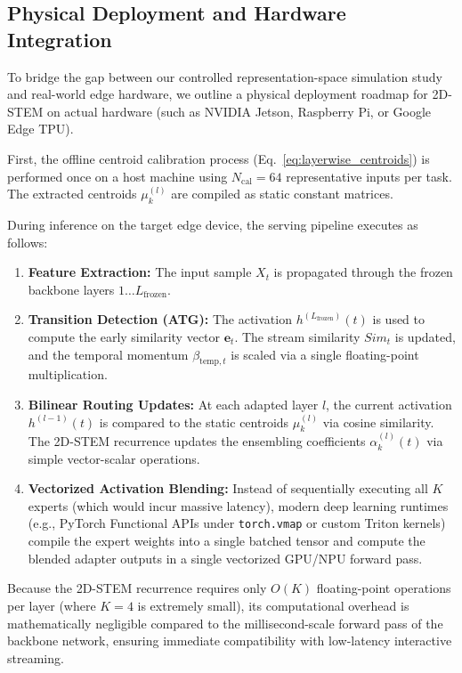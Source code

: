 \subsection{Physical Deployment and Hardware Integration}
To bridge the gap between our controlled representation-space simulation study and real-world edge hardware, we outline a physical deployment roadmap for 2D-STEM on actual hardware (such as NVIDIA Jetson, Raspberry Pi, or Google Edge TPU).

First, the offline centroid calibration process (Eq.~\ref{eq:layerwise_centroids}) is performed once on a host machine using $N_{\text{cal}} = 64$ representative inputs per task. The extracted centroids $\mu_k^{(l)}$ are compiled as static constant matrices. 

During inference on the target edge device, the serving pipeline executes as follows:
\begin{enumerate}
    \item \textbf{Feature Extraction:} The input sample $X_t$ is propagated through the frozen backbone layers $1 \dots L_{\text{frozen}}$.
    \item \textbf{Transition Detection (ATG):} The activation $h^{(L_{\text{frozen}})}(t)$ is used to compute the early similarity vector $\mathbf{e}_t$. The stream similarity $Sim_t$ is updated, and the temporal momentum $\beta_{\text{temp}, t}$ is scaled via a single floating-point multiplication.
    \item \textbf{Bilinear Routing Updates:} At each adapted layer $l$, the current activation $h^{(l-1)}(t)$ is compared to the static centroids $\mu_k^{(l)}$ via cosine similarity. The 2D-STEM recurrence updates the ensembling coefficients $\alpha_k^{(l)}(t)$ via simple vector-scalar operations.
    \item \textbf{Vectorized Activation Blending:} Instead of sequentially executing all $K$ experts (which would incur massive latency), modern deep learning runtimes (e.g., PyTorch Functional APIs under \texttt{torch.vmap} or custom Triton kernels) compile the expert weights into a single batched tensor and compute the blended adapter outputs in a single vectorized GPU/NPU forward pass.
\end{enumerate}
Because the 2D-STEM recurrence requires only $O(K)$ floating-point operations per layer (where $K=4$ is extremely small), its computational overhead is mathematically negligible compared to the millisecond-scale forward pass of the backbone network, ensuring immediate compatibility with low-latency interactive streaming.

